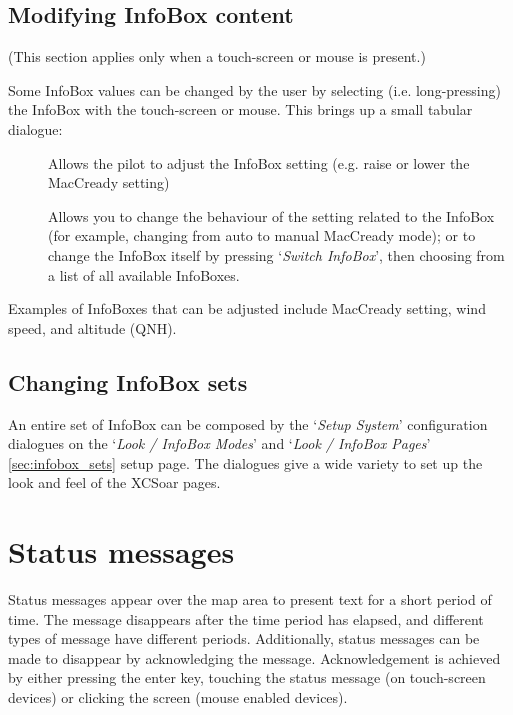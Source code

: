 \blink{}\blink{}\blink{}\blink{}


\subsection*{Modifying InfoBox content}

(This section applies only when a touch-screen or mouse is present.)

Some InfoBox values can be changed by the user by selecting (i.e. long-pressing) the
InfoBox with the touch-screen or mouse.  This brings up a small tabular dialogue:

\begin{description}
\item[]  
  Allows the pilot to adjust the InfoBox setting (e.g. raise or lower the 
  MacCready setting)

\item[]
  Allows you to change the behaviour of the setting related to the InfoBox 
  (for example, changing from auto to manual MacCready mode); or 
  to change the InfoBox itself by pressing `{\it Switch InfoBox}', then 
  choosing from a list of all available InfoBoxes.

\end{description}

Examples of InfoBoxes that can
be adjusted include MacCready setting, wind speed, and altitude (QNH).


\subsection*{Changing InfoBox sets}

An entire set of InfoBox can be composed by the `{\it Setup System}' configuration 
dialogues on the `{\it Look / InfoBox Modes}' and `{\it Look / InfoBox Pages}' 
\ref{sec:infobox_sets} setup page. 
The dialogues give a wide variety to set up the look and feel of the XCSoar pages.  


\section{Status messages}

Status messages appear over the map area to present text for a short period of
time.  The message disappears after the time period has elapsed, and different
types of message have different periods. Additionally, status messages can be
made to disappear by acknowledging the message.  Acknowledgement is achieved by
either pressing the enter key, touching the status
message (on touch-screen devices) or clicking the screen (mouse enabled devices).

